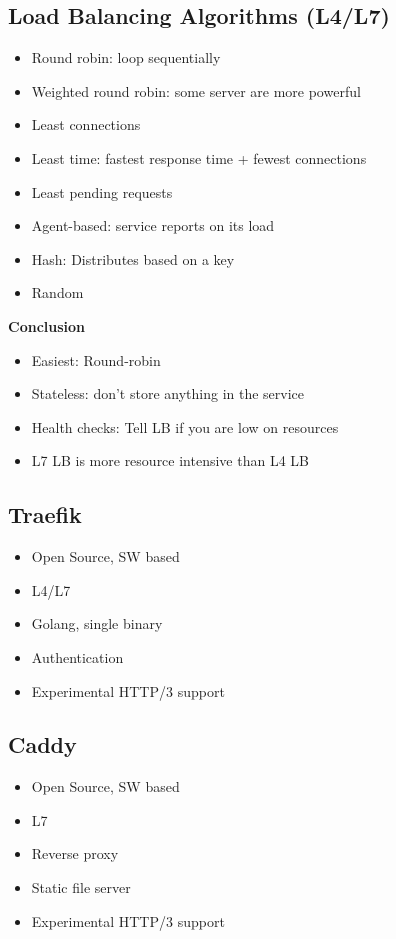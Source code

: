 \subsection{Load Balancing Algorithms (L4/L7)}
\begin{itemize}
    \item Round robin: loop sequentially
    \item Weighted round robin: some server are more powerful
    \item Least connections
    \item Least time: fastest response time + fewest connections
    \item Least pending requests
    \item Agent-based: service reports on its load
    \item Hash: Distributes based on a key
    \item Random
\end{itemize}
\textbf{Conclusion}
\begin{itemize}
    \item Easiest: Round-robin
    \item Stateless: don't store anything in the service
    \item Health checks: Tell LB if you are low on resources
    \item L7 LB is more resource intensive than L4 LB
\end{itemize}

\subsection{Traefik}
\begin{itemize}
    \item Open Source, SW based
    \item L4/L7
    \item Golang, single binary
    \item Authentication
    \item Experimental HTTP/3 support
\end{itemize}

\subsection{Caddy}
\begin{itemize}
    \item Open Source, SW based
    \item L7
    \item Reverse proxy
    \item Static file server
    \item Experimental HTTP/3 support
\end{itemize}

